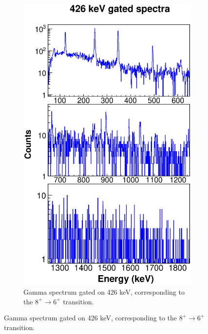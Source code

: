    \begin{figure}
    \ContinuedFloat
    \begin{subfigure}{\textwidth}
    \includegraphics[scale=0.8]{154GdTablesAndFigs/426_gamma.eps}
    \caption{Gamma spectrum gated on 426 keV, corresponding to the $8^+\rightarrow6^+$ transition.}
    \label{fig:154_6to4spec}
    \end{subfigure}
\end{figure}